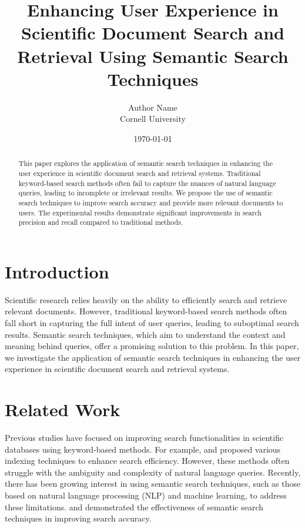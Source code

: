 \documentclass{article}
\title{Enhancing User Experience in Scientific Document Search and Retrieval Using Semantic Search Techniques}
\author{Author Name \\ Cornell University}
\date{\today}
\begin{document}
\maketitle

\begin{abstract}
This paper explores the application of semantic search techniques in enhancing the user experience in scientific document search and retrieval systems. Traditional keyword-based search methods often fail to capture the nuances of natural language queries, leading to incomplete or irrelevant results. We propose the use of semantic search techniques to improve search accuracy and provide more relevant documents to users. The experimental results demonstrate significant improvements in search precision and recall compared to traditional methods.
\end{abstract}

\section{Introduction}
Scientific research relies heavily on the ability to efficiently search and retrieve relevant documents. However, traditional keyword-based search methods often fall short in capturing the full intent of user queries, leading to suboptimal search results. Semantic search techniques, which aim to understand the context and meaning behind queries, offer a promising solution to this problem. In this paper, we investigate the application of semantic search techniques in enhancing the user experience in scientific document search and retrieval systems.

\section{Related Work}
Previous studies have focused on improving search functionalities in scientific databases using keyword-based methods. For example, \cite{example1} and \cite{example2} proposed various indexing techniques to enhance search efficiency. However, these methods often struggle with the ambiguity and complexity of natural language queries. Recently, there has been growing interest in using semantic search techniques, such as those based on natural language processing (NLP) and machine learning, to address these limitations. \cite{example3} and \cite{example4} demonstrated the effectiveness of semantic search techniques in improving search accuracy.
\end{document}
